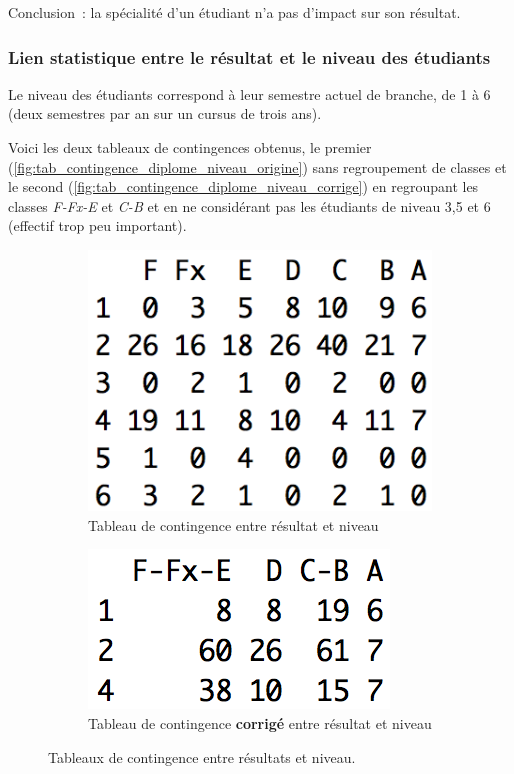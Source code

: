 \documentclass[a4paper,11pt]{report}
\begin{document}
Conclusion~: la spécialité d'un étudiant n'a pas d'impact sur son résultat.


\subsubsection{Lien statistique entre le résultat et le niveau des étudiants}

Le niveau des étudiants correspond à leur semestre actuel de branche, de 1 à 6 (deux semestres par an sur un cursus de trois ans).

Voici les deux tableaux de contingences obtenus, le premier (\autoref{fig:tab_contingence_diplome_niveau_origine}) sans regroupement de classes et le second (\autoref{fig:tab_contingence_diplome_niveau_corrige}) en regroupant les classes \textit{F-Fx-E} et \textit{C-B} et en ne considérant pas les étudiants de niveau 3,5 et 6 (effectif trop peu important).

\begin{figure}[H]
	\centering
	\captionsetup{justification=centering, margin=2cm}
	\begin{subfigure}[b]{0.5\linewidth}
		\centering
		\captionsetup{justification=centering, margin=1cm}
		\includegraphics[width=0.5\linewidth]{img/1-1-2-Contingence-Result-Niveau-Origine}
		\caption{\scriptsize Tableau de contingence entre résultat et niveau}
		\label{fig:tab_contingence_diplome_niveau_origine}
	\end{subfigure}%
	\begin{subfigure}[b]{0.5\linewidth}
		\centering
		\captionsetup{justification=centering, margin=1cm}
		\includegraphics[width=0.5\linewidth]{img/1-1-2-Contingence-Result-Niveau-Corrige}
		\caption{\scriptsize Tableau de contingence \textbf{corrigé} entre résultat et niveau}
		\label{fig:tab_contingence_diplome_niveau_corrige}
	\end{subfigure}%
	\caption{
		\small Tableaux de contingence entre résultats et niveau.
	}
	\label{fig:tabs_contingence_resultats_niveau}%
\end{figure}
\end{document}

